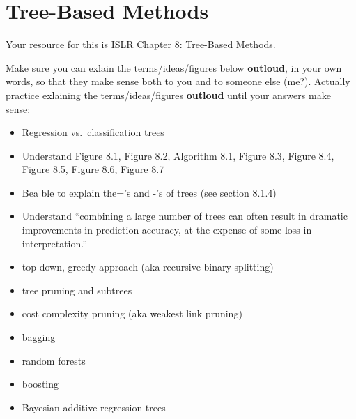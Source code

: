 \documentclass[
]{book}
\providecommand{\tightlist}{%
  \setlength{\itemsep}{0pt}\setlength{\parskip}{0pt}}
\begin{document}
\hypertarget{tree-based-methods}{%
\chapter{Tree-Based Methods}\label{tree-based-methods}}

Your resource for this is ISLR Chapter 8: Tree-Based Methods.

Make sure you can exlain the terms/ideas/figures below \textbf{outloud}, in your own words, so that they make sense both to you and to someone else (me?). Actually practice exlaining the terms/ideas/figures \textbf{outloud} until your answers make sense:

\begin{itemize}
\tightlist
\item
  Regression vs.~classification trees
\item
  Understand Figure 8.1, Figure 8.2, Algorithm 8.1, Figure 8.3, Figure 8.4, Figure 8.5, Figure 8.6, Figure 8.7
\item
  Bea ble to explain the='s and -'s of trees (see section 8.1.4)
\item
  Understand ``combining a large number of trees
  can often result in dramatic improvements in prediction accuracy, at the expense of some loss in interpretation.''
\item
  top-down, greedy approach (aka recursive binary splitting)
\item
  tree pruning and subtrees
\item
  cost complexity pruning (aka weakest link pruning)
\item
  bagging
\item
  random forests
\item
  boosting
\item
  Bayesian additive regression trees
\end{itemize}

  
\end{document}
